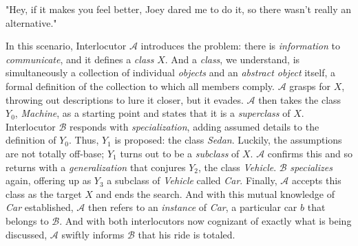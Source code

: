 \begin{addmargin}[8em]{2em}
	\begin{flushright}
		"Hey, if it makes you feel better, Joey dared me to do it, so there wasn't really an alternative." \\[2\baselineskip]
	\end{flushright}
\end{addmargin}

In this scenario, Interlocutor $\mathcal{A}$ introduces the problem: there is \textit{information} to \textit{communicate}, and it defines a \textit{class} $X$. And a \textit{class}, we understand, is simultaneously a collection of individual \textit{objects} and an \textit{abstract object} itself, a formal definition of the collection to which all members comply. $\mathcal{A}$ grasps for $X$, throwing out descriptions to lure it closer, but it evades. $\mathcal{A}$ then takes the class $Y_0$, \textit{Machine}, as a starting point and states that it is a \textit{superclass} of $X$. \\

Interlocutor $\mathcal{B}$ responds with \textit{specialization}, adding assumed details to the definition of $Y_0$. Thus, $Y_1$ is proposed: the class \textit{Sedan}. Luckily, the assumptions are not totally off-base; $Y_1$ turns out to be a \textit{subclass} of $X$. $\mathcal{A}$ confirms this and so returns with a \textit{generalization} that conjures $Y_2$, the class \textit{Vehicle}. $\mathcal{B}$ \textit{specializes} again, offering up as $Y_3$ a subclass of \textit{Vehicle} called \textit{Car}. Finally, $\mathcal{A}$ accepts this class as the target $X$ and ends the search. And with this mutual knowledge of \textit{Car} established, $\mathcal{A}$ then refers to an \textit{instance} of \textit{Car}, a particular car $b$ that belongs to $\mathcal{B}$. And with both interlocutors now cognizant of exactly what is being discussed, $\mathcal{A}$ swiftly informs $\mathcal{B}$ that his ride is totaled.

